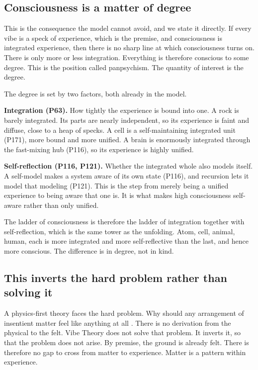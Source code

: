 \subsection{Consciousness is a matter of degree}

This is the consequence the model cannot avoid, and we state it directly. If every vibe is a speck of experience, which is the premise, and consciousness is integrated experience, then there is no sharp line at which consciousness turns on. There is only more or less integration. Everything is therefore conscious to some degree. This is the position called panpsychism. The quantity of interest is the degree.

The degree is set by two factors, both already in the model.

\textbf{Integration (P63).} How tightly the experience is bound into one. A rock is barely integrated. Its parts are nearly independent, so its experience is faint and diffuse, close to a heap of specks. A cell is a self-maintaining integrated unit (P171), more bound and more unified. A brain is enormously integrated through the fast-mixing hub (P116), so its experience is highly unified.

\textbf{Self-reflection (P116, P121).} Whether the integrated whole also models itself. A self-model makes a system aware of its own state (P116), and recursion lets it model that modeling (P121). This is the step from merely being a unified experience to being aware that one is. It is what makes high consciousness self-aware rather than only unified.

The ladder of consciousness is therefore the ladder of integration together with self-reflection, which is the same tower as the unfolding. Atom, cell, animal, human, each is more integrated and more self-reflective than the last, and hence more conscious. The difference is in degree, not in kind.

\subsection{This inverts the hard problem rather than solving it}

A physics-first theory faces the hard problem. Why should any arrangement of insentient matter feel like anything at all \cite{chalmers1995}. There is no derivation from the physical to the felt. Vibe Theory does not solve that problem. It inverts it, so that the problem does not arise. By premise, the ground is already felt. There is therefore no gap to cross from matter to experience. Matter is a pattern within experience.

